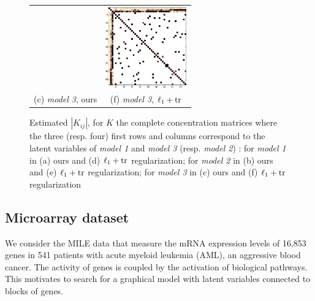 \begin{figure}
\begin{tabular}{cc}
  &   \includegraphics[width=3.5cm]{fig/diff_tr}
   \\    (c)  \textit{model 3}, ours & (f)  \textit{model 3}, $\ell_1+{\rm tr}$  \\[6pt]
\end{tabular}
\caption{Estimated $|K_{ij}|$, for $K$ the complete concentration matrices where the three (resp. four) first rows and columns correspond to the latent variables of \textit{model 1} and \textit{model 3} (resp. \textit{model 2}) : for \textit{model 1} in (a) ours and (d) $\ell_1+{\rm tr}$ regularization; for \textit{model 2} in (b) ours and (e) $\ell_1+{\rm tr}$ regularization; for \textit{model 3} in (c) ours and (f) $\ell_1+{\rm tr}$ regularization }
\end{figure}


\subsection{Microarray dataset}

We consider the MILE data \citep{haferlach2010clinical} that measure the mRNA expression levels of 16,853 genes in 541 patients with acute myeloid leukemia (AML), an aggressive blood cancer. The activity of genes is coupled by the activation of biological pathways. This motivates to search for a graphical model with latent variables connected to blocks of genes.

